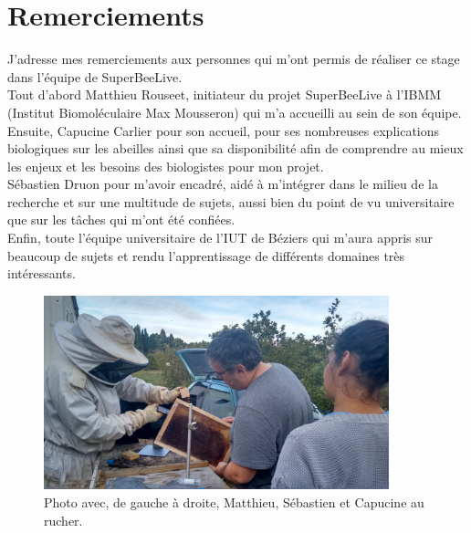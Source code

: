 \documentclass[11pt,french,a4paper]{report}
\begin{document}
\clearpage
\newpage 



\chapter*{Remerciements}

J’adresse mes remerciements aux personnes qui m’ont permis de réaliser ce stage dans l’équipe de SuperBeeLive. \\
Tout d’abord Matthieu Rouseet, initiateur du projet SuperBeeLive à l'IBMM (Institut Biomoléculaire Max Mousseron) 
qui m’a accueilli au sein de son équipe. \\

Ensuite, Capucine Carlier pour son accueil, pour ses nombreuses explications biologiques sur les abeilles ainsi que sa disponibilité 
afin de comprendre au mieux les enjeux et les besoins des biologistes pour mon projet. \\

Sébastien Druon pour m’avoir encadré, aidé à m’intégrer dans le milieu de la recherche et sur une multitude 
de sujets, aussi bien du point de vu universitaire que sur les tâches qui m’ont été confiées. \\

Enfin, toute l'équipe universitaire de l'IUT de Béziers qui m'aura appris sur beaucoup de sujets et rendu l'apprentissage
de différents domaines très intéressants. 

\begin{figure}[!h]
\centering
\includegraphics[width=10cm]{../images/photo/IMG_20171110_154804205_HDR.jpg}
\caption{Photo avec, de gauche à droite, Matthieu, Sébastien et Capucine au rucher.}
\label{ruche_pers}
\end{figure}



\tableofcontent

\clearpage
\end{document}

